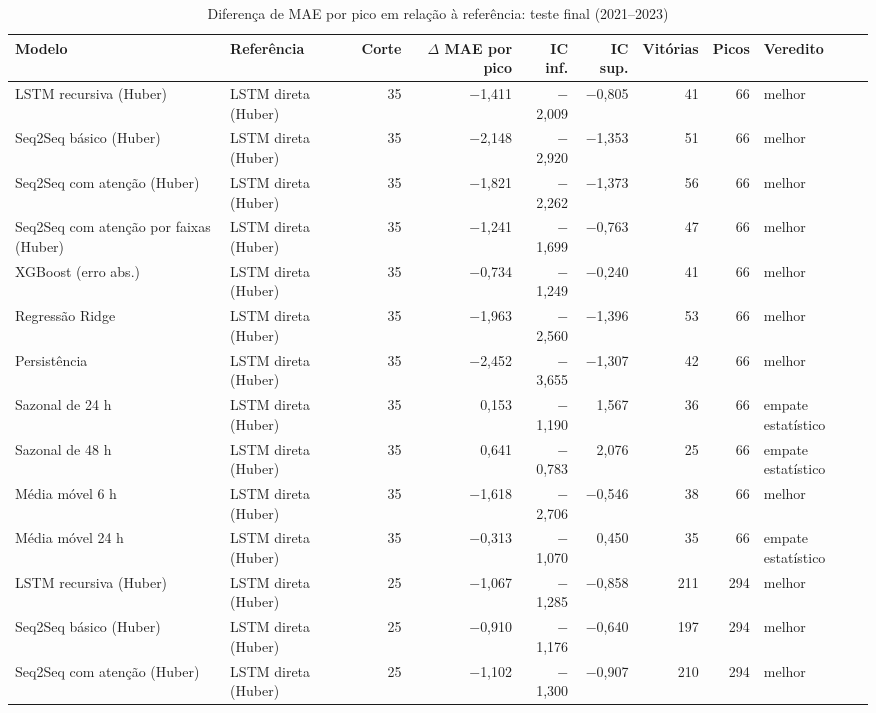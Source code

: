 \begin{table}[!htbp]
    \centering
    \caption{Diferença de MAE por pico em relação à referência: teste final (2021--2023)}
    \label{tab:eventos_pareado_holdout}
    \small
    \begin{adjustbox}{max width=\textwidth}
    \begin{tabular}{llrrrrrrl}
        \toprule
        Modelo & Referência & Corte & $\Delta$ MAE por pico & IC inf. & IC sup. & Vitórias & Picos & Veredito \\
        \midrule
        LSTM recursiva (Huber) & LSTM direta (Huber) & 35 & $-$1,411 & $-$2,009 & $-$0,805 & 41 & 66 & melhor \\
        Seq2Seq básico (Huber) & LSTM direta (Huber) & 35 & $-$2,148 & $-$2,920 & $-$1,353 & 51 & 66 & melhor \\
        Seq2Seq com atenção (Huber) & LSTM direta (Huber) & 35 & $-$1,821 & $-$2,262 & $-$1,373 & 56 & 66 & melhor \\
        Seq2Seq com atenção por faixas (Huber) & LSTM direta (Huber) & 35 & $-$1,241 & $-$1,699 & $-$0,763 & 47 & 66 & melhor \\
        XGBoost (erro abs.) & LSTM direta (Huber) & 35 & $-$0,734 & $-$1,249 & $-$0,240 & 41 & 66 & melhor \\
        Regressão Ridge & LSTM direta (Huber) & 35 & $-$1,963 & $-$2,560 & $-$1,396 & 53 & 66 & melhor \\
        \midrule
        Persistência & LSTM direta (Huber) & 35 & $-$2,452 & $-$3,655 & $-$1,307 & 42 & 66 & melhor \\
        Sazonal de 24 h & LSTM direta (Huber) & 35 & 0,153 & $-$1,190 & 1,567 & 36 & 66 & empate estatístico \\
        Sazonal de 48 h & LSTM direta (Huber) & 35 & 0,641 & $-$0,783 & 2,076 & 25 & 66 & empate estatístico \\
        Média móvel 6 h & LSTM direta (Huber) & 35 & $-$1,618 & $-$2,706 & $-$0,546 & 38 & 66 & melhor \\
        Média móvel 24 h & LSTM direta (Huber) & 35 & $-$0,313 & $-$1,070 & 0,450 & 35 & 66 & empate estatístico \\
        LSTM recursiva (Huber) & LSTM direta (Huber) & 25 & $-$1,067 & $-$1,285 & $-$0,858 & 211 & 294 & melhor \\
        Seq2Seq básico (Huber) & LSTM direta (Huber) & 25 & $-$0,910 & $-$1,176 & $-$0,640 & 197 & 294 & melhor \\
        Seq2Seq com atenção (Huber) & LSTM direta (Huber) & 25 & $-$1,102 & $-$1,300 & $-$0,907 & 210 & 294 & melhor \\

\end{tabular}
\end{adjustbox}
\end{table}

